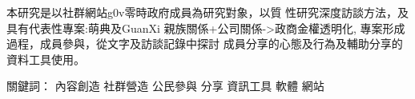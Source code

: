 \begin{abstractcn}

\vspace{2em}
本研究是以社群網站g0v零時政府成員為研究對象，以質
性研究深度訪談方法，及具有代表性專案:萌典及GuanXi 親族關係+公司關係->政商金權透明化,
專案形成過程，成員參與，從文字及訪談記錄中探討
成員分享的心態及行為及輔助分享的資料工具使用。


關鍵詞： 內容創造   社群營造     公民參與 分享 資訊工具 軟體 網站
\end{abstractcn} 
